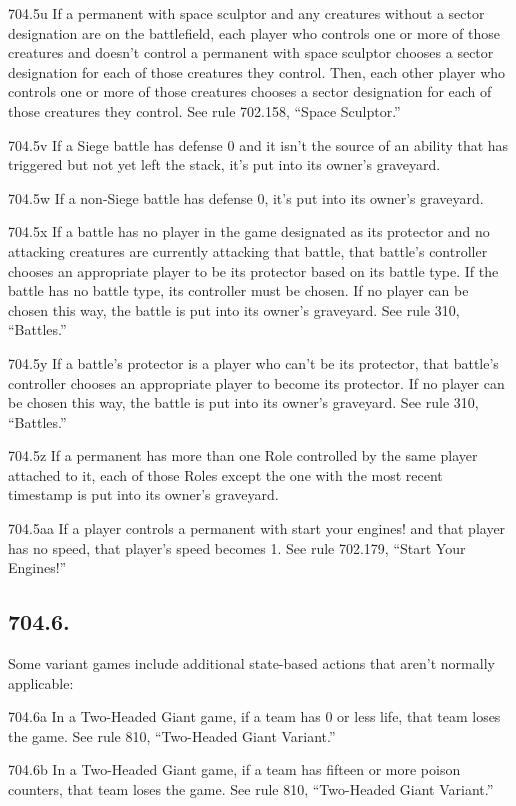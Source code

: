 704.5u If a permanent with space sculptor and any creatures without a sector designation are on the battlefield, each player who controls one or more of those creatures and doesn’t control a permanent with space sculptor chooses a sector designation for each of those creatures they control. Then, each other player who controls one or more of those creatures chooses a sector designation for each of those creatures they control. See rule 702.158, “Space Sculptor.”

704.5v If a Siege battle has defense 0 and it isn’t the source of an ability that has triggered but not yet left the stack, it’s put into its owner’s graveyard.

704.5w If a non-Siege battle has defense 0, it’s put into its owner’s graveyard.

704.5x If a battle has no player in the game designated as its protector and no attacking creatures are currently attacking that battle, that battle’s controller chooses an appropriate player to be its protector based on its battle type. If the battle has no battle type, its controller must be chosen. If no player can be chosen this way, the battle is put into its owner’s graveyard. See rule 310, “Battles.”

704.5y If a battle’s protector is a player who can’t be its protector, that battle’s controller chooses an appropriate player to become its protector. If no player can be chosen this way, the battle is put into its owner’s graveyard. See rule 310, “Battles.”

704.5z If a permanent has more than one Role controlled by the same player attached to it, each of those Roles except the one with the most recent timestamp is put into its owner’s graveyard.

704.5aa If a player controls a permanent with start your engines! and that player has no speed, that player’s speed becomes 1. See rule 702.179, “Start Your Engines!”

\subsection*{704.6.}
Some variant games include additional state-based actions that aren’t normally applicable:

704.6a In a Two-Headed Giant game, if a team has 0 or less life, that team loses the game. See rule 810, “Two-Headed Giant Variant.”

704.6b In a Two-Headed Giant game, if a team has fifteen or more poison counters, that team loses the game. See rule 810, “Two-Headed Giant Variant.”

